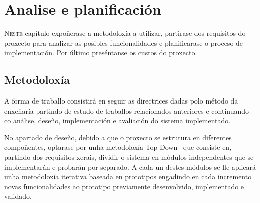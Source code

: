 \chapter{Analise e planificación}
\label{chap:Analise e planificación}
\lettrine{N}{este} capítulo expoñerase a metodoloxía a utilizar, partirase dos requisitos do proxecto para analizar as posibles funcionalidades e planificarase o proceso de implementación. Por último preséntanse os custos do proxecto.

\section{Metodoloxía}
A forma de traballo consistirá en seguir as directrices dadas polo método da enxeñaría partindo de estudo de traballos relacionados anteriores e continuando co análise, deseño, implementación e avaliación do sistema implementado.

No apartado de deseño, debido a que o proxecto se estrutura en diferentes compoñentes, optarase por unha metodoloxía Top-Down~\cite{TopdownBottomupDesign2019} que consiste en, partindo dos requisitos xerais, dividir o sistema en módulos independentes que se implementarán e probarán por separado. A cada un destes módulos se lle aplicará unha metodoloxía iterativa baseada en prototipos engadindo en cada incremento novas funcionalidades ao prototipo previamente desenvolvido, implementado e validado.

